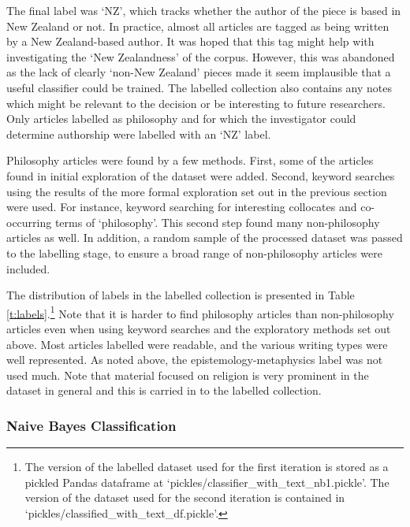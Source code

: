 \documentclass{article}
\begin{document}
The final label was `NZ', which tracks whether the author of the piece is based in New Zealand or not. In practice, almost all articles are tagged as being written by a New Zealand-based author. It was hoped that this tag might help with investigating the `New Zealandness' of the corpus. However, this was abandoned as the lack of clearly `non-New Zealand' pieces made it seem implausible that a useful classifier could be trained. The labelled collection also contains any notes which might be relevant to the decision or be interesting to future researchers. Only articles labelled as philosophy and for which the investigator could determine authorship were labelled with an `NZ' label.

Philosophy articles were found by a few methods. First, some of the articles found in initial exploration of the dataset were added. Second, keyword searches using the results of the more formal exploration set out in the previous section were used. For instance, keyword searching for interesting collocates and co-occurring terms of `philosophy'. This second step found many non-philosophy articles as well. In addition, a random sample of the processed dataset was passed to the labelling stage, to ensure a broad range of non-philosophy articles were included.

The distribution of labels in the labelled collection is presented in Table \ref{t:labels}.\footnote{The version of the labelled dataset used for the first iteration is stored as a pickled Pandas dataframe at `pickles/classifier\_\-with\_\-text\_\-nb1.pickle'. The version of the dataset used for the second iteration is contained in `pickles/classified\_\-with\_\-text\_\-df.pickle'.} Note that it is harder to find philosophy articles than non-philosophy articles even when using keyword searches and the exploratory methods set out above. Most articles labelled were readable, and the various writing types were well represented. As noted above, the epistemology-metaphysics label was not used much. Note that material focused on religion is very prominent in the dataset in general and this is carried in to the labelled collection.

\subsubsection{Naive Bayes Classification}\label{s:nbc}
\end{document}
